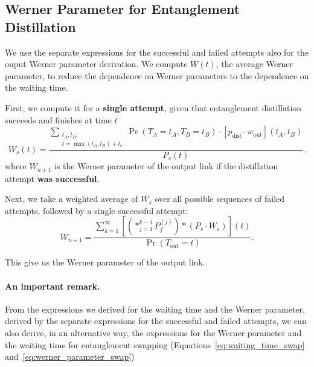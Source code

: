 \documentclass{masterthesis}
\begin{document}
\subsection{Werner Parameter for Entanglement Distillation}

We use the separate expressions for the successful and failed attempts also for the ouput Werner parameter derivation. 
We compute $W(t)$, the average Werner parameter, to reduce the dependence on Werner parameters to the dependence on the waiting time.

First, we compute it for a \textbf{single attempt}, given that entanglement distillation succeeds and finishes at time $t$
\begin{equation}
    W_s(t) = \frac{\sum_{\substack{t_A, t_B : \\ t = \max(t_A, t_B) + t_c}} \Pr(T_A = t_A, T_B = t_B) \cdot [p_\text{dist} \cdot w_{\text{out}}](t_A, t_B)}{P_s(t)}.
\end{equation}
where $W_{n+1}$ is the Werner parameter of the output link if the distillation attempt \textbf{was successful}.

Next, we take a weighted average of $W_s$ over all possible sequences of failed attempts, followed by a single successful attempt:
\begin{equation}\label{eq:werner_parameter_distillation}
    W_{n+1} = \frac{\sum_{k=1}^{\infty} \left[ \left( \ast_{j=1}^{k-1} P_f^{(j)} \right) \ast (P_s \cdot W_s) \right] (t)}{\Pr(T_\text{out} = t)}.
\end{equation}

This give us the Werner parameter of the output link.

\paragraph*{An important remark.} From the expressions we derived for the waiting time and the Werner parameter, derived by the separate expressions for the successful and failed attempts, we can also derive, in an alternative way, the expressions for the Werner parameter and the waiting time for entanglement swapping (Equations~\ref{eq:waiting_time_swap} and~\ref{eq:werner_parameter_swap})


\end{document}

